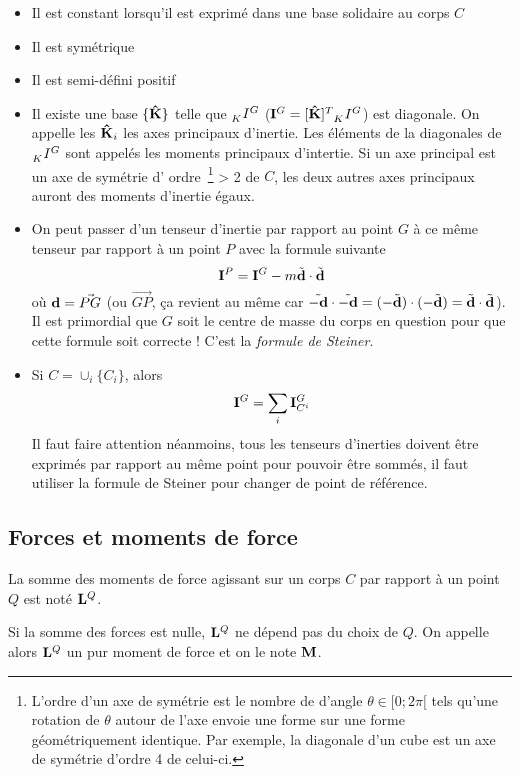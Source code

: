 \begin{itemize}
	\item Il est constant lorsqu'il est exprimé dans une base solidaire au corps $C$
	\item Il est symétrique
	\item Il est semi-défini positif
	\item
		Il existe une base $\{{\bf\hat{K}}\}$ telle que $\wtr{K}{I}{G}$ ($\ine^G = [\uk]^T \wtr{K}{I}{G}$) est diagonale.
		On appelle les ${\bf\hat{K}}_i$ les axes principaux d'inertie.
		Les éléments de la diagonales de $\wtr{K}{I}{G}$ sont appelés les moments principaux d'intertie.
		Si un axe principal est un axe de symétrie d'
		ordre~\footnote{L'ordre d'un axe de symétrie est le nombre de d'angle $\theta \in [0; 2\pi[$ tels qu'une rotation de $\theta$ autour de l'axe envoie une forme sur une forme géométriquement identique.
		Par exemple, la diagonale d'un cube est un axe de symétrie d'ordre 4 de celui-ci.}
		> 2 de $C$, les deux autres axes principaux auront des moments d'inertie égaux.
	\item
		On peut passer d'un tenseur d'inertie par rapport au point $G$ à ce même tenseur par rapport à un point $P$ avec la formule suivante
		\[ {\bf I}^P =  {\bf I}^G - m \tilde{{\bf d}}\cdot\tilde{{\bf d}} \]
		où ${\bf d} = \vec{PG}$ (ou $\vec{GP}$, ça revient au même car $\tilde{-{\bf d}}\cdot\tilde{-{\bf d}} = (-\tilde{{\bf d}})\cdot(-\tilde{{\bf d}}) = \tilde{{\bf d}}\cdot\tilde{{\bf d}}$).
		Il est primordial que $G$ soit le centre de masse du corps en question pour que cette formule soit correcte !
		C'est la {\em formule de Steiner}.
	\item
		Si $C = \cup_i \{C_i\}$, alors
		\[ {\bf I}^G = \sum_i {\bf I}_{C^i}^G \]
		Il faut faire attention néanmoins, tous les tenseurs d'inerties doivent
        être exprimés par rapport au même point pour pouvoir être sommés,
        il faut utiliser la formule de
        Steiner pour changer de point de référence.
\end{itemize}

\subsection{Forces et moments de force}
La somme des moments de force agissant sur un corps $C$ par rapport à un point $Q$ est noté ${\bf L}^Q$.

Si la somme des forces est nulle, ${\bf L}^Q$ ne dépend pas du choix de $Q$.
On appelle alors ${\bf L}^Q$ un pur moment de force et on le note ${\bf M}$.

